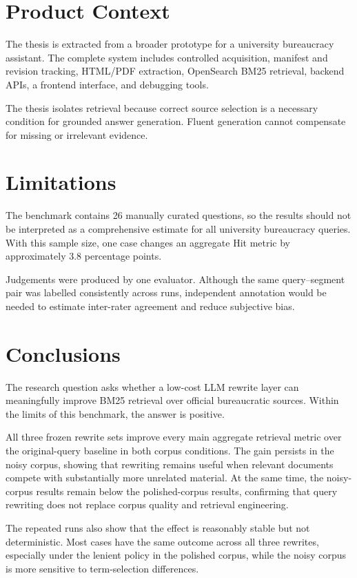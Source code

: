 \section{Product Context}

The thesis is extracted from a broader prototype for a university bureaucracy assistant. The complete system includes controlled acquisition, manifest and revision tracking, HTML/PDF extraction, OpenSearch BM25 retrieval, backend APIs, a frontend interface, and debugging tools.

The thesis isolates retrieval because correct source selection is a necessary condition for grounded answer generation. Fluent generation cannot compensate for missing or irrelevant evidence.

\section{Limitations}

The benchmark contains 26 manually curated questions, so the results should not be interpreted as a comprehensive estimate for all university bureaucracy queries. With this sample size, one case changes an aggregate Hit metric by approximately 3.8 percentage points.

Judgements were produced by one evaluator. Although the same query--segment pair was labelled consistently across runs, independent annotation would be needed to estimate inter-rater agreement and reduce subjective bias.

\section{Conclusions}

The research question asks whether a low-cost LLM rewrite layer can meaningfully improve BM25 retrieval over official bureaucratic sources. Within the limits of this benchmark, the answer is positive.

All three frozen rewrite sets improve every main aggregate retrieval metric over the original-query baseline in both corpus conditions. The gain persists in the noisy corpus, showing that rewriting remains useful when relevant documents compete with substantially more unrelated material. At the same time, the noisy-corpus results remain below the polished-corpus results, confirming that query rewriting does not replace corpus quality and retrieval engineering.

The repeated runs also show that the effect is reasonably stable but not deterministic. Most cases have the same outcome across all three rewrites, especially under the lenient policy in the polished corpus, while the noisy corpus is more sensitive to term-selection differences.

